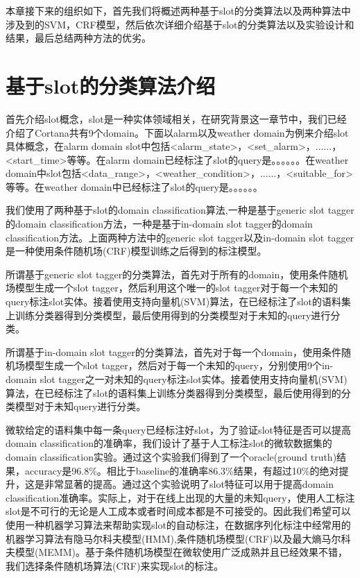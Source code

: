 \documentclass[master]{njuthesis}
\begin{document}
    本章接下来的组织如下，首先我们将概述两种基于slot的分类算法以及两种算法中涉及到的SVM，CRF模型，然后依次详细介绍基于slot的分类算法以及实验设计和结果，最后总结两种方法的优劣。

    
\section{基于slot的分类算法介绍}
   
    首先介绍slot概念，slot是一种实体领域相关，在研究背景这一章节中，我们已经介绍了Cortana共有9个domain。下面以alarm以及weather domain为例来介绍slot具体概念，在alarm domain slot中包括<alarm\_state>，<set\_alarm>，......，<start\_time>等等。在alarm domain已经标注了slot的query是。。。。。。在weather domain中slot包括<data\_range>，<weather\_condition>，......，<suitable\_for>等等。在weather domain中已经标注了slot的query是。。。。。。

    我们使用了两种基于slot的domain classification算法,一种是基于generic slot tagger的domain classification方法，一种是基于in-domain slot tagger的domain classification方法。上面两种方法中的generic slot tagger以及in-domain slot tagger是一种使用条件随机场(CRF)模型训练之后得到的标注模型。
    
    所谓基于generic slot tagger的分类算法，首先对于所有的domain，使用条件随机场模型生成一个slot tagger，然后利用这个唯一的slot tagger对于每一个未知的query标注slot实体。接着使用支持向量机(SVM)算法，在已经标注了slot的语料集上训练分类器得到分类模型，最后使用得到的分类模型对于未知的query进行分类。

    所谓基于in-domain slot tagger的分类算法，首先对于每一个domain，使用条件随机场模型生成一个slot tagger，然后对于每一个未知的query，分别使用9个in-domain slot tagger之一对未知的query标注slot实体。接着使用支持向量机(SVM)算法，在已经标注了slot的语料集上训练分类器得到分类模型，最后使用得到的分类模型对于未知query进行分类。
    
    微软给定的语料集中每一条query已经标注好slot，为了验证slot特征是否可以提高domain classification的准确率，我们设计了基于人工标注slot的微软数据集的domain classification实验。通过这个实验我们得到了一个oracle(ground truth)结果，accuracy是96.8\%。相比于baseline的准确率86.3\%结果，有超过10\%的绝对提升，这是非常显著的提高。通过这个实验说明了slot特征可以用于提高domain classification准确率。实际上，对于在线上出现的大量的未知query，使用人工标注slot是不可行的无论是人工成本或者时间成本都是不可接受的。因此我们希望可以使用一种机器学习算法来帮助实现slot的自动标注，在数据序列化标注中经常用的机器学习算法有隐马尔科夫模型(HMM),条件随机场模型(CRF)以及最大熵马尔科夫模型(MEMM)。基于条件随机场模型在微软使用广泛成熟并且已经效果不错，我们选择条件随机场算法(CRF)来实现slot的标注。
    
\end{document}
